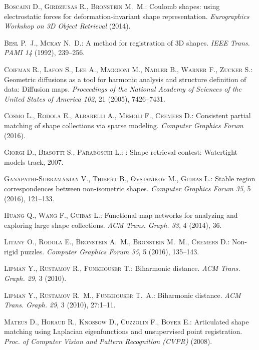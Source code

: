\documentclass{egpubl}
\begin{document}
\begin{thebibliography}{\uppercase{vKZHCO11}}
\textsc{Boscaini D., Girdziusas R., Bronstein M.~M.}:
\newblock Coulomb shapes: using electrostatic forces for deformation-invariant
  shape representation.
\newblock \emph{Eurographics Workshop on 3D Object Retrieval} (2014).

\textsc{Besl P.~J., Mckay N.~D.}:
\newblock A method for registration of {3D} shapes.
\newblock \emph{IEEE Trans. PAMI 14} (1992), 239--256.

\textsc{Coifman R., Lafon S., Lee A., Maggioni M., Nadler B., Warner F., Zucker
  S.}:
\newblock Geometric diffusions as a tool for harmonic analysis and structure
  definition of data: Diffusion maps.
\newblock \emph{Proceedings of the National Academy of Sciences of the United
  States of America 102}, 21 (2005), 7426--7431.

\textsc{Cosmo L., Rodola E., Albarelli A., Memoli F., Cremers D.}:
\newblock Consistent partial matching of shape collections via sparse modeling.
\newblock \emph{Computer Graphics Forum} (2016).

\textsc{Giorgi D., Biasotti S., Paraboschi L.}:
: Shape retrieval contest: Watertight models track, 2007.

\textsc{Ganapathi-Subramanian V., Thibert B., Ovsjanikov M., Guibas L.}:
\newblock Stable region correspondences between non-isometric shapes.
\newblock \emph{Computer Graphics Forum 35}, 5 (2016), 121--133.

\textsc{Huang Q., Wang F., Guibas L.}:
\newblock Functional map networks for analyzing and exploring large shape
  collections.
\newblock \emph{ACM Trans. Graph. 33}, 4 (2014), 36.

\textsc{Litany O., Rodola E., Bronstein A.~M., Bronstein M.~M., Cremers D.}:
\newblock Non-rigid puzzles.
\newblock \emph{Computer Graphics Forum 35}, 5 (2016), 135--143.

\textsc{Lipman Y., Rustamov R., Funkhouser T.}:
\newblock Biharmonic distance.
\newblock \emph{ACM Trans. Graph. 29}, 3 (2010).

\textsc{Lipman Y., Rustamov R.~M., Funkhouser T.~A.}:
\newblock Biharmonic distance.
\newblock \emph{ACM Trans. Graph. 29}, 3 (2010), 27:1--11.

\textsc{Mateus D., Horaud R., Knossow D., Cuzzolin F., Boyer E.}:
\newblock Articulated shape matching using {Laplacian} eigenfunctions and
  unsupervised point registration.
\newblock \emph{Proc. of Computer Vision and Pattern Recognition (CVPR)}
  (2008).


\end{thebibliography}
\end{document}
